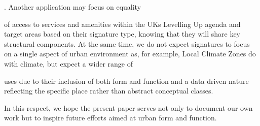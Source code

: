 . Another application may focus on equality

of access to services and amenities within the UKs Levelling Up agenda and target
areas based on their signature type, knowing that they will share key structural
components. At the same time, we do not expect signatures to focus on a single
aspect of urban environment as, for example, Local Climate Zones \cite{stewart2012local}
do with climate, but expect a wider range of

uses due to their inclusion of both form and function and a data driven nature reflecting
the specific place rather than abstract conceptual classes.

%
In this respect, we hope the present paper serves not only to document our own
work but to inspire future efforts aimed at urban form and function.








